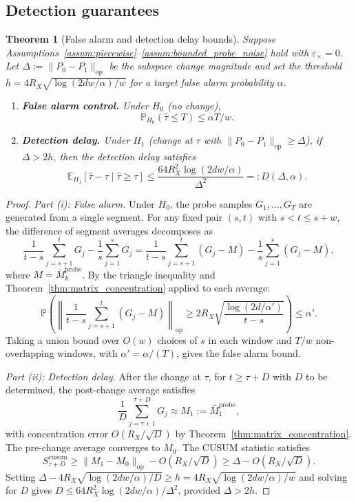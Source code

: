 \documentclass[12pt]{article}
\newcommand{\E}{\mathbb{E}}
\newcommand{\Prob}{\mathbb{P}}
\newcommand{\op}{\mathrm{op}}
\newtheorem{theorem}{Theorem}
\theoremstyle{plain}
\theoremstyle{definition}
\begin{document}
\subsection{Detection guarantees}

\begin{theorem}[False alarm and detection delay bounds]
\label{thm:cusum}
Suppose Assumptions~\ref{assum:piecewise}--\ref{assum:bounded_probe_noise} hold with $\varepsilon_\times = 0$. Let $\Delta := \|P_0 - P_1\|_{\op}$ be the subspace change magnitude and set the threshold $h = 4R_X\sqrt{\log(2dw/\alpha)/w}$ for a target false alarm probability $\alpha$.
\begin{enumerate}[label=(\roman*)]
\item \textbf{False alarm control.} Under $H_0$ (no change),
\begin{equation}
\Prob_{H_0}(\hat\tau \le T) \le \alpha T / w.
\label{eq:false_alarm}
\end{equation}

\item \textbf{Detection delay.} Under $H_1$ (change at $\tau$ with $\|P_0 - P_1\|_{\op} \ge \Delta$), if $\Delta > 2h$, then the detection delay satisfies
\begin{equation}
\E_{H_1}[\hat\tau - \tau \mid \hat\tau \ge \tau] \le \frac{64 R_X^2 \log(2dw/\alpha)}{\Delta^2} =: D(\Delta, \alpha).
\label{eq:detection_delay}
\end{equation}
\end{enumerate}
\end{theorem}

\begin{proof}
\emph{Part (i): False alarm.}
Under $H_0$, the probe samples $G_1, \ldots, G_T$ are generated from a single segment. For any fixed pair $(s, t)$ with $s < t \le s + w$, the difference of segment averages decomposes as
\[
\frac{1}{t-s}\sum_{j=s+1}^t G_j - \frac{1}{s}\sum_{j=1}^s G_j
= \frac{1}{t-s}\sum_{j=s+1}^t (G_j - M) - \frac{1}{s}\sum_{j=1}^s (G_j - M),
\]
where $M = \bar{M}_k^{\mathrm{probe}}$. By the triangle inequality and Theorem~\ref{thm:matrix_concentration} applied to each average:
\[
\Prob\!\left(\left\|\frac{1}{t-s}\sum_{j=s+1}^t (G_j - M)\right\|_{\op} \ge 2R_X\sqrt{\frac{\log(2d/\alpha')}{t-s}}\right) \le \alpha'.
\]
Taking a union bound over $O(w)$ choices of $s$ in each window and $T/w$ non-overlapping windows, with $\alpha' = \alpha/(T)$, gives the false alarm bound.

\emph{Part (ii): Detection delay.}
After the change at $\tau$, for $t \ge \tau + D$ with $D$ to be determined, the post-change average satisfies
\[
\frac{1}{D}\sum_{j=\tau+1}^{\tau+D} G_j \approx M_1 := \bar{M}_1^{\mathrm{probe}},
\]
with concentration error $O(R_X / \sqrt{D})$ by Theorem~\ref{thm:matrix_concentration}. The pre-change average converges to $M_0$. The CUSUM statistic satisfies
\[
S_{\tau+D}^{\mathrm{cusum}} \ge \|M_1 - M_0\|_{\op} - O(R_X / \sqrt{D}) \ge \Delta - O(R_X / \sqrt{D}).
\]
Setting $\Delta - 4R_X\sqrt{\log(2dw/\alpha)/D} \ge h = 4R_X\sqrt{\log(2dw/\alpha)/w}$ and solving for $D$ gives $D \le 64R_X^2\log(2dw/\alpha)/\Delta^2$, provided $\Delta > 2h$.
\end{proof}
\end{document}
